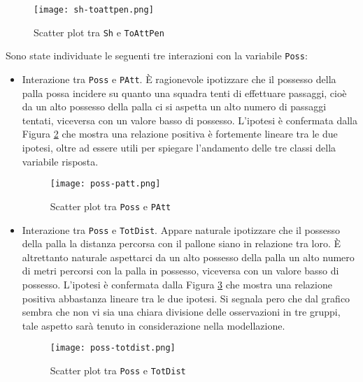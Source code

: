 \begin{itemize}
	\begin{figure}[htbp]
		\begin{center}
			\texttt{[image: sh-toattpen.png]}
			\caption{Scatter plot tra \texttt{Sh} e \texttt{ToAttPen}}  \label{fig:shpen}
		\end{center}
	\end{figure}
\end{itemize}

Sono state individuate le seguenti tre interazioni con la variabile \texttt{Poss}:
\begin{itemize}
	\item Interazione tra \texttt{Poss} e \texttt{PAtt}. È ragionevole ipotizzare che il possesso della palla possa incidere su quanto una squadra tenti di effettuare passaggi, cioè da un alto possesso della palla ci si aspetta un alto numero di passaggi tentati, viceversa con un valore basso di possesso. L'ipotesi è confermata dalla Figura \ref{fig:posspatt} che mostra una relazione positiva è fortemente lineare tra le due ipotesi, oltre ad essere utili per spiegare l'andamento delle tre classi della variabile risposta.
	\begin{figure}[htbp]
		\begin{center}
			\texttt{[image: poss-patt.png]}
			\caption{Scatter plot tra \texttt{Poss} e \texttt{PAtt}}  \label{fig:posspatt}
		\end{center}
	\end{figure}
	\item Interazione tra \texttt{Poss} e \texttt{TotDist}. Appare naturale ipotizzare che il possesso della palla la distanza percorsa con il pallone siano in relazione tra loro. È altrettanto naturale aspettarci da un alto possesso della palla un alto numero di metri percorsi con la palla in possesso, viceversa con un valore basso di possesso. L'ipotesi è confermata dalla Figura \ref{fig:posstotdist} che mostra una relazione positiva abbastanza lineare tra le due ipotesi. Si segnala pero che dal grafico sembra che non vi sia una chiara divisione delle osservazioni in tre gruppi, tale aspetto sarà tenuto in considerazione nella modellazione.
	\begin{figure}[htbp]
		\begin{center}
			\texttt{[image: poss-totdist.png]}
			\caption{Scatter plot tra \texttt{Poss} e \texttt{TotDist}}  \label{fig:posstotdist}
		\end{center}
	\end{figure}
\end{itemize}
